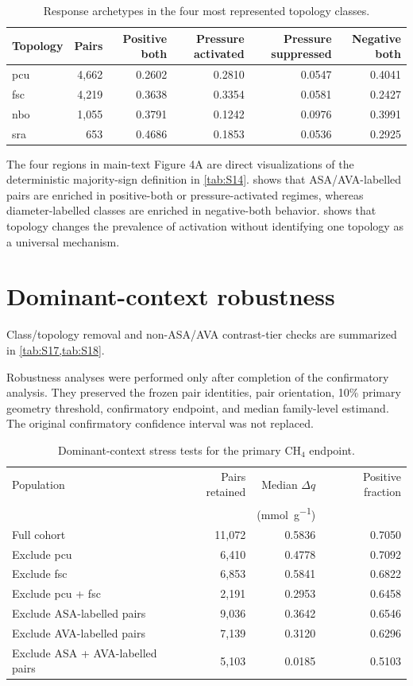 \documentclass[11pt,a4paper]{article}
\begin{document}
\begin{table}[H]
\centering
\caption{Response archetypes in the four most represented topology classes.}
\label{tab:S16}
\begin{tabular}{lrrrrr}
\toprule
Topology & Pairs & Positive both & Pressure activated & Pressure suppressed &
Negative both \\
\midrule
pcu & 4,662 & 0.2602 & 0.2810 & 0.0547 & 0.4041 \\
fsc & 4,219 & 0.3638 & 0.3354 & 0.0581 & 0.2427 \\
nbo & 1,055 & 0.3791 & 0.1242 & 0.0976 & 0.3991 \\
sra & 653 & 0.4686 & 0.1853 & 0.0536 & 0.2925 \\
\bottomrule
\end{tabular}
\end{table}


The four regions in main-text Figure 4A are direct visualizations of the
deterministic majority-sign definition in \cref{tab:S14}.  shows that
ASA/AVA-labelled pairs are enriched in positive-both or pressure-activated regimes,
whereas diameter-labelled classes are enriched in negative-both behavior.
 shows that topology changes the prevalence of activation without
identifying one topology as a universal mechanism.

\section{Dominant-context robustness}
\label{sec:robustness}

Class/topology removal and non-ASA/AVA contrast-tier checks are summarized in
\cref{tab:S17,tab:S18}.


Robustness analyses were performed only after completion of the confirmatory
analysis. They preserved the frozen pair identities, pair orientation, 10\%
primary geometry threshold, confirmatory endpoint, and median family-level
estimand. The original confirmatory confidence interval was not replaced.

\begin{table}[H]
\centering
\caption{Dominant-context stress tests for the primary CH$_4$ endpoint.}
\label{tab:S17}
\begin{tabular}{lrrr}
\toprule
Population & Pairs retained & Median $\Delta q$ & Positive fraction \\
 & & (\si{\milli\mole\per\gram}) & \\
\midrule
Full cohort & 11,072 & 0.5836 & 0.7050 \\
Exclude pcu & 6,410 & 0.4778 & 0.7092 \\
Exclude fsc & 6,853 & 0.5841 & 0.6822 \\
Exclude pcu + fsc & 2,191 & 0.2953 & 0.6458 \\
Exclude ASA-labelled pairs & 9,036 & 0.3642 & 0.6546 \\
Exclude AVA-labelled pairs & 7,139 & 0.3120 & 0.6296 \\
Exclude ASA + AVA-labelled pairs & 5,103 & 0.0185 & 0.5103 \\
\bottomrule
\end{tabular}
\end{table}
\end{document}
